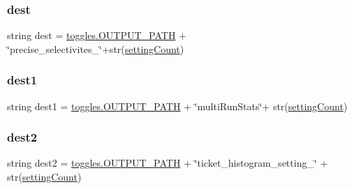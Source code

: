\subsubsection{\texorpdfstring{dest}{dest}}
{\footnotesize\ttfamily string dest = \hyperlink{namespacedynamicfilterapp_1_1toggles_a04644ded1d5e3fc8bd58a411209b7886}{toggles.\+O\+U\+T\+P\+U\+T\+\_\+\+P\+A\+TH} + \char`\"{}precise\+\_\+selectivites\+\_\+\char`\"{}+str(\hyperlink{classdynamicfilterapp_1_1test__simulations_1_1_simulation_test_a18e9dc3d267483ccc2dbacf54439c5ff}{setting\+Count})\hspace{0.3cm}{\ttfamily [static]}}

\mbox{\label{classdynamicfilterapp_1_1test__simulations_1_1_simulation_test_a378bd708ce64c9205a9d5b7ef5179008}} 
\subsubsection{\texorpdfstring{dest1}{dest1}}
{\footnotesize\ttfamily string dest1 = \hyperlink{namespacedynamicfilterapp_1_1toggles_a04644ded1d5e3fc8bd58a411209b7886}{toggles.\+O\+U\+T\+P\+U\+T\+\_\+\+P\+A\+TH} + \char`\"{}multi\+Run\+Stats\char`\"{}+ str(\hyperlink{classdynamicfilterapp_1_1test__simulations_1_1_simulation_test_a18e9dc3d267483ccc2dbacf54439c5ff}{setting\+Count})\hspace{0.3cm}{\ttfamily [static]}}

\mbox{\label{classdynamicfilterapp_1_1test__simulations_1_1_simulation_test_a55df54097e78f89cfbea1eac42c38c6c}} 
\subsubsection{\texorpdfstring{dest2}{dest2}}
{\footnotesize\ttfamily string dest2 = \hyperlink{namespacedynamicfilterapp_1_1toggles_a04644ded1d5e3fc8bd58a411209b7886}{toggles.\+O\+U\+T\+P\+U\+T\+\_\+\+P\+A\+TH} + \char`\"{}ticket\+\_\+histogram\+\_\+setting\+\_\+\char`\"{} + str(\hyperlink{classdynamicfilterapp_1_1test__simulations_1_1_simulation_test_a18e9dc3d267483ccc2dbacf54439c5ff}{setting\+Count})\hspace{0.3cm}{\ttfamily [static]}}

